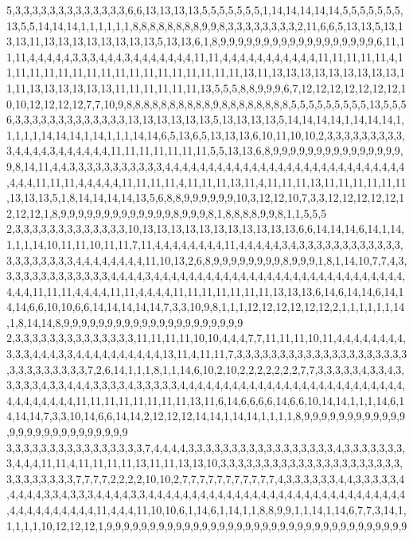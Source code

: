5,3,3,3,3,3,3,3,3,3,3,3,3,3,6,6,13,13,13,13,5,5,5,5,5,5,5,1,14,14,14,14,14,5,5,5,5,5,5,5,13,5,5,14,14,14,1,1,1,1,1,1,8,8,8,8,8,8,8,8,9,9,8,3,3,3,3,3,3,3,3,2,11,6,6,5,13,13,5,13,13,13,11,13,13,13,13,13,13,13,13,5,13,13,6,1,8,9,9,9,9,9,9,9,9,9,9,9,9,9,9,9,9,9,9,6,11,11,11,4,4,4,4,4,3,3,3,4,4,4,3,4,4,4,4,4,4,4,11,11,4,4,4,4,4,4,4,4,4,4,4,11,11,11,11,11,4,11,11,11,11,11,11,11,11,11,11,11,11,11,11,11,11,11,13,11,13,13,13,13,13,13,13,13,13,11,11,13,13,13,13,13,13,11,11,11,11,11,11,13,5,5,5,8,8,9,9,9,6,7,12,12,12,12,12,12,12,10,10,12,12,12,12,7,7,10,9,8,8,8,8,8,8,8,8,8,8,9,8,8,8,8,8,8,8,8,5,5,5,5,5,5,5,5,5,13,5,5,5
6,3,3,3,3,3,3,3,3,3,3,3,3,3,13,13,13,13,13,13,5,13,13,13,13,5,14,14,14,14,1,14,14,14,1,1,1,1,1,14,14,14,1,14,1,1,1,14,14,6,5,13,6,5,13,13,13,6,10,11,10,10,2,3,3,3,3,3,3,3,3,3,3,4,4,4,4,3,4,4,4,4,4,4,11,11,11,11,11,11,11,5,5,13,13,6,8,9,9,9,9,9,9,9,9,9,9,9,9,9,9,9,9,8,14,11,4,4,3,3,3,3,3,3,3,3,3,3,3,4,4,4,4,4,4,4,4,4,4,4,4,4,4,4,4,4,4,4,4,4,4,4,4,4,4,4,4,4,4,4,11,11,11,4,4,4,4,4,11,11,11,11,4,11,11,11,13,11,4,11,11,11,13,11,11,11,11,11,11,13,13,13,5,1,8,14,14,14,14,13,5,6,8,8,9,9,9,9,9,9,10,3,12,12,10,7,3,3,12,12,12,12,12,12,12,12,1,8,9,9,9,9,9,9,9,9,9,9,9,9,9,8,9,9,9,8,1,8,8,8,8,9,9,8,1,1,5,5,5
2,3,3,3,3,3,3,3,3,3,3,3,3,3,10,13,13,13,13,13,13,13,13,13,13,13,6,6,14,14,14,6,14,1,14,1,1,1,14,10,11,11,10,11,11,7,11,4,4,4,4,4,4,4,4,11,4,4,4,4,4,3,4,3,3,3,3,3,3,3,3,3,3,3,3,3,3,3,3,3,3,3,3,4,4,4,4,4,4,4,4,11,10,13,2,6,8,9,9,9,9,9,9,9,9,8,9,9,9,1,8,1,14,10,7,7,4,3,3,3,3,3,3,3,3,3,3,3,3,3,4,4,4,4,3,4,4,4,4,4,4,4,4,4,4,4,4,4,4,4,4,4,4,4,4,4,4,4,4,4,4,4,4,4,4,4,4,11,11,11,4,4,4,4,11,11,4,4,4,4,11,11,11,11,11,11,11,13,13,13,6,14,6,14,14,6,14,14,14,6,6,10,10,6,6,14,14,14,14,14,7,3,3,10,9,8,1,1,1,12,12,12,12,12,12,2,1,1,1,1,1,1,14,1,8,14,14,8,9,9,9,9,9,9,9,9,9,9,9,9,9,9,9,9,9,9,9,9,9
2,3,3,3,3,3,3,3,3,3,3,3,3,3,3,11,11,11,11,10,10,4,4,4,7,7,11,11,11,10,11,4,4,4,4,4,4,4,4,3,3,3,4,4,4,3,3,4,4,4,4,4,4,4,4,4,4,13,11,4,11,11,7,3,3,3,3,3,3,3,3,3,3,3,3,3,3,3,3,3,3,3,3,3,3,3,3,3,3,3,3,3,7,2,6,14,1,1,1,8,1,1,14,6,10,2,10,2,2,2,2,2,2,2,7,7,3,3,3,3,3,4,3,3,4,3,3,3,3,3,4,3,3,4,4,4,3,3,3,3,4,3,3,3,3,3,4,4,4,4,4,4,4,4,4,4,4,4,4,4,4,4,4,4,4,4,4,4,4,4,4,4,4,4,4,4,4,4,4,4,11,11,11,11,11,11,11,11,13,11,6,14,6,6,6,6,14,6,6,10,14,14,1,1,1,14,6,14,14,14,7,3,3,10,14,6,6,14,14,2,12,12,12,14,14,1,14,14,1,1,1,1,8,9,9,9,9,9,9,9,9,9,9,9,9,9,9,9,9,9,9,9,9,9,9,9,9,9,9
3,3,3,3,3,3,3,3,3,3,3,3,3,3,3,3,7,4,4,4,4,3,3,3,3,3,3,3,3,3,3,3,3,3,3,3,3,3,4,3,3,3,3,3,3,3,3,4,4,4,11,11,4,11,11,11,11,13,11,11,13,13,10,3,3,3,3,3,3,3,3,3,3,3,3,3,3,3,3,3,3,3,3,3,3,3,3,3,3,3,3,3,7,7,7,7,2,2,2,2,10,10,2,7,7,7,7,7,7,7,7,7,7,7,4,3,3,3,3,3,3,4,4,3,3,3,3,3,4,4,4,4,4,3,3,4,3,3,3,4,4,4,4,3,3,4,4,4,4,4,4,4,4,4,4,4,4,4,4,4,4,4,4,4,4,4,4,4,4,4,4,4,4,4,4,4,4,4,4,4,4,4,4,4,4,11,4,4,4,11,10,10,6,1,14,6,1,14,1,1,8,8,9,9,1,1,14,1,14,6,7,7,3,14,1,1,1,1,1,10,12,12,12,1,9,9,9,9,9,9,9,9,9,9,9,9,9,9,9,9,9,9,9,9,9,9,9,9,9,9,9,9,9,9,9,9,9,9,9
